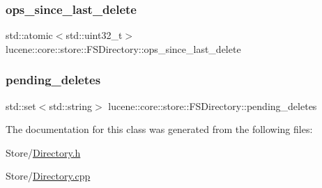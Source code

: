 \subsubsection{\texorpdfstring{ops\+\_\+since\+\_\+last\+\_\+delete}{ops\_since\_last\_delete}}
{\footnotesize\ttfamily std\+::atomic$<$std\+::uint32\+\_\+t$>$ lucene\+::core\+::store\+::\+F\+S\+Directory\+::ops\+\_\+since\+\_\+last\+\_\+delete\hspace{0.3cm}{\ttfamily [private]}}

\mbox{\label{classlucene_1_1core_1_1store_1_1FSDirectory_a5adc58d180335b6ee768e746707f02c5}} 
\subsubsection{\texorpdfstring{pending\+\_\+deletes}{pending\_deletes}}
{\footnotesize\ttfamily std\+::set$<$std\+::string$>$ lucene\+::core\+::store\+::\+F\+S\+Directory\+::pending\+\_\+deletes\hspace{0.3cm}{\ttfamily [private]}}



The documentation for this class was generated from the following files\+:\begin{DoxyCompactItemize}
\item 
Store/\mbox{\hyperlink{Directory_8h}{Directory.\+h}}\item 
Store/\mbox{\hyperlink{Directory_8cpp}{Directory.\+cpp}}\end{DoxyCompactItemize}
